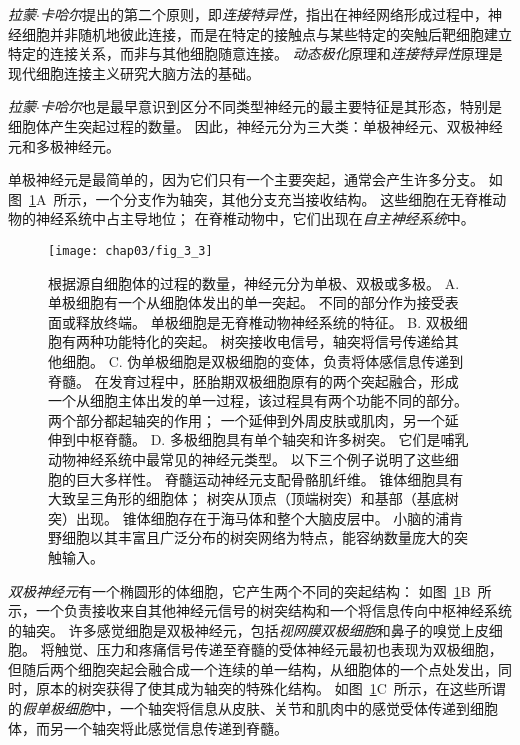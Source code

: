 \textit{拉蒙$\cdot$卡哈尔}提出的第二个原则，即\textit{连接特异性}，指出在神经网络形成过程中，神经细胞并非随机地彼此连接，而是在特定的接触点与某些特定的突触后靶细胞建立特定的连接关系，而非与其他细胞随意连接。
\textit{动态极化}原理和\textit{连接特异性}原理是现代细胞连接主义研究大脑方法的基础。


\textit{拉蒙$\cdot$卡哈尔}也是最早意识到区分不同类型神经元的最主要特征是其形态，特别是细胞体产生突起过程的数量。 
因此，神经元分为三大类：单极神经元、双极神经元和多极神经元。


单极神经元是最简单的，因为它们只有一个主要突起，通常会产生许多分支。
如图~\ref{fig:3_3}A~所示，一个分支作为轴突，其他分支充当接收结构。
这些细胞在无脊椎动物的神经系统中占主导地位；
在脊椎动物中，它们出现在\textit{自主神经系统}中。


\begin{figure}[htbp]
	\centering
	\texttt{[image: chap03/fig\_3\_3]}
	\caption{根据源自细胞体的过程的数量，神经元分为单极、双极或多极。 
		A. 单极细胞有一个从细胞体发出的单一突起。
		不同的部分作为接受表面或释放终端。
		单极细胞是无脊椎动物神经系统的特征。 
		B. 双极细胞有两种功能特化的突起。
		树突接收电信号，轴突将信号传递给其他细胞。
		C. 伪单极细胞是双极细胞的变体，负责将体感信息传递到脊髓。
		在发育过程中，胚胎期双极细胞原有的两个突起融合，形成一个从细胞主体出发的单一过程，该过程具有两个功能不同的部分。 
		两个部分都起轴突的作用；
		一个延伸到外周皮肤或肌肉，另一个延伸到中枢脊髓\cite{ross2006histology}。
		D. 多极细胞具有单个轴突和许多树突。 
		它们是哺乳动物神经系统中最常见的神经元类型。 
		以下三个例子说明了这些细胞的巨大多样性。 
		脊髓运动神经元支配骨骼肌纤维。
		锥体细胞具有大致呈三角形的细胞体；
		树突从顶点（顶端树突）和基部（基底树突）出现。 
		锥体细胞存在于海马体和整个大脑皮层中。 
	小脑的浦肯野细胞以其丰富且广泛分布的树突网络为特点，能容纳数量庞大的突触输入\cite{ross2006histology}。}
	\label{fig:3_3}
\end{figure}


\textit{双极神经元}有一个椭圆形的体细胞，它产生两个不同的突起结构：
如图~\ref{fig:3_3}B~所示，一个负责接收来自其他神经元信号的树突结构和一个将信息传向中枢神经系统的轴突。
许多感觉细胞是双极神经元，包括\textit{视网膜双极细胞}和鼻子的嗅觉上皮细胞。
将触觉、压力和疼痛信号传递至脊髓的受体神经元最初也表现为双极细胞，但随后两个细胞突起会融合成一个连续的单一结构，从细胞体的一个点处发出，同时，原本的树突获得了使其成为轴突的特殊化结构。 
如图~\ref{fig:3_3}C~所示，在这些所谓的\textit{假单极细胞}中，一个轴突将信息从皮肤、关节和肌肉中的感觉受体传递到细胞体，而另一个轴突将此感觉信息传递到脊髓。


